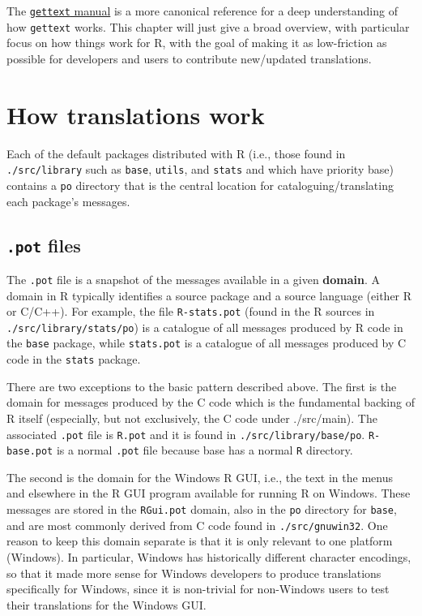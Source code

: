 \documentclass[
]{book}
\begin{document}
The \href{https://www.gnu.org/software/gettext/manual/index.html}{\texttt{gettext} manual} is a more canonical reference for a
deep understanding of how \texttt{gettext} works. This chapter will just give a broad overview, with particular focus on
how things work for R, with the goal of making it as low-friction as possible for developers and users to contribute
new/updated translations.

\hypertarget{how-translations-work}{%
\section{How translations work}\label{how-translations-work}}

Each of the default packages distributed with R (i.e., those found in \texttt{./src/library} such as \texttt{base}, \texttt{utils},
and \texttt{stats} and which have priority base) contains a \texttt{po} directory that is the central location for cataloguing/translating each package's
messages.

\hypertarget{pot-files}{%
\subsection{\texorpdfstring{\texttt{.pot} files}{.pot files}}\label{pot-files}}

The \texttt{.pot} file is a snapshot of the messages available in a given \textbf{domain}. A domain in R typically identifies
a source package and a source language (either R or C/C++). For example, the file \texttt{R-stats.pot}
(found in the R sources in \texttt{./src/library/stats/po}) is a catalogue of all messages produced by R code in the
\texttt{base} package, while \texttt{stats.pot} is a catalogue of all messages produced by C code in the \texttt{stats} package.

There are two exceptions to the basic pattern described above. The first is the domain for messages produced by
the C code which is the fundamental backing of R itself (especially, but not exclusively, the C code under
./src/main). The associated \texttt{.pot} file is \texttt{R.pot} and it is found in \texttt{./src/library/base/po}. \texttt{R-base.pot} is a
normal \texttt{.pot} file because base has a normal \texttt{R} directory.

The second is the domain for the Windows R GUI, i.e., the text in the menus and elsewhere in the R GUI program
available for running R on Windows. These messages are stored in the \texttt{RGui.pot} domain, also in the \texttt{po}
directory for \texttt{base}, and are most commonly derived from C code found in \texttt{./src/gnuwin32}. One reason to keep
this domain separate is that it is only relevant to one platform (Windows). In particular, Windows has historically
different character encodings, so that it made more sense for Windows developers to produce translations specifically for Windows, since it is non-trivial for non-Windows users to test their translations for the Windows GUI.
\end{document}
